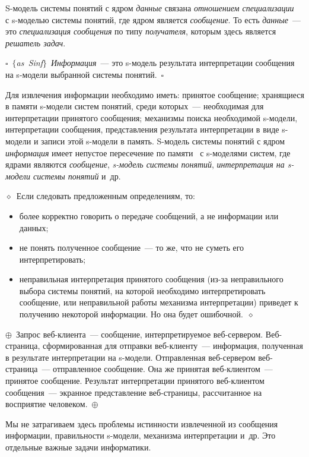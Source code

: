 \begin{multicols}{2}
S-модель системы понятий с ядром \textit{данные} связана \textit{отношением 
специализации}~\cite{7il} с s-мо\-делью сис\-те\-мы понятий, где ядром является 
\textit{сообщение}. То есть \textit{данные}~--- это \textit{специализация 
сообщения} по типу \textit{получателя}, которым здесь является \textit{решатель 
задач}.

\noindent
$\square$~$\{$\textit{as~Sinf}$\}$~\textit{Информация}~--- это s-модель
результата интерпретации сообщения на s-модели выбранной системы
понятий.~$\square$

Для извлечения информации необходимо иметь: принятое сообщение;
хранящиеся в памяти s-мо\-де\-ли систем понятий, среди которых~--- необходимая
для интерпретации принятого сообщения; механизмы поиска необходимой
s-модели, интерпретации сообщения, представления результата интерпретации
в виде s-модели и записи этой s-модели в память. S-модель системы понятий с
ядром \textit{информация} имеет непустое пересечение по памяти~\cite{7il} с
s-моделями систем, где ядрами являются \textit{сообщение}, \textit{s-модель
системы понятий}, \textit{интерпретация на s-модели системы понятий}
и~др.

\noindent
$\diamond$~Если следовать предложенным определениям, то:
\begin{itemize}
\item более корректно говорить о передаче сообщений, а не информации или
данных;
\item не понять полученное сообщение~--- то же, что не суметь его
интерпретировать;
\item неправильная интерпретация принятого сообщения (из-за неправильного
выбора системы понятий, на которой необходимо интерпретировать
сообщение, или неправильной работы механизма интерпретации) приведет к
получению некоторой информации. Но она будет ошибочной.~$\diamond$
\end{itemize}

\noindent $\oplus$~Запрос веб-кли\-ен\-та~--- сообщение, интерпретируемое 
веб-сер\-ве\-ром. Веб-стра\-ни\-ца, сформированная для отправки 
веб-кли\-ен\-ту~--- информация, полученная в результате интерпретации на 
s-мо\-де\-ли. Отправленная веб-сер\-ве\-ром веб-стра\-ни\-ца~--- отправленное 
сообщение. Она же принятая веб-кли\-ен\-том~--- принятое сообщение. Результат 
интерпретации принятого веб-кли\-ен\-том сообщения~--- экранное представление 
веб-стра\-ни\-цы, рассчитанное на восприятие человеком.~$\oplus$

Мы не затрагиваем здесь проблемы истинности извлеченной из сообщения
информации, правильности s-модели, механизма интерпретации и~др. Это
отдельные важные задачи информатики.


\end{multicols}

